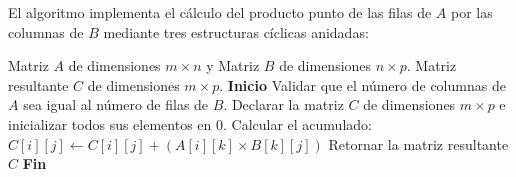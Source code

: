 \documentclass[12pt]{article}
\begin{document}
El algoritmo implementa el cálculo del producto punto de las filas de $A$ por las columnas de $B$ mediante tres estructuras cíclicas anidadas:
\begin{algorithm}[H]
\caption{Multiplicación de dos matrices}
\begin{algorithmic}[1]
    \REQUIRE Matriz $A$ de dimensiones $m \times n$ y Matriz $B$ de dimensiones $n \times p$.
    \ENSURE Matriz resultante $C$ de dimensiones $m \times p$.
    \STATE \textbf{Inicio}
    \STATE Validar que el número de columnas de $A$ sea igual al número de filas de $B$.
    \STATE Declarar la matriz $C$ de dimensiones $m \times p$ e inicializar todos sus elementos en $0$.
                \STATE Calcular el acumulado: $C[i][j] \leftarrow C[i][j] + (A[i][k] \times B[k][j])$
            \ENDFOR
        \ENDFOR
    \ENDFOR
    \STATE Retornar la matriz resultante $C$
    \STATE \textbf{Fin}
\end{algorithmic}
\end{algorithm}
\end{document}
